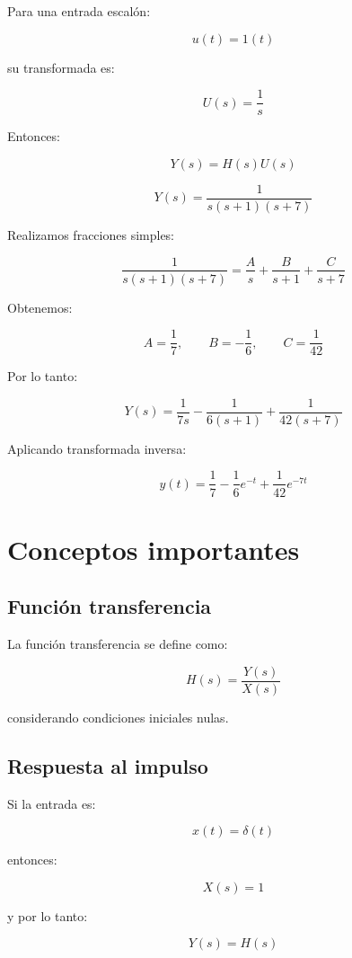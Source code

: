 \documentclass[12pt,a4paper]{article}
\begin{document}
Para una entrada escalón:

\[
u(t)=1(t)
\]

su transformada es:

\[
U(s)=\frac{1}{s}
\]

Entonces:

\[
Y(s)=H(s)U(s)
\]

\[
Y(s)
=
\frac{1}{s(s+1)(s+7)}
\]

Realizamos fracciones simples:

\[
\frac{1}{s(s+1)(s+7)}
=
\frac{A}{s}
+
\frac{B}{s+1}
+
\frac{C}{s+7}
\]

Obtenemos:

\[
A=\frac{1}{7},
\qquad
B=-\frac{1}{6},
\qquad
C=\frac{1}{42}
\]

Por lo tanto:

\[
Y(s)
=
\frac{1}{7s}
-
\frac{1}{6(s+1)}
+
\frac{1}{42(s+7)}
\]

Aplicando transformada inversa:

\[
\boxed{
y(t)
=
\frac{1}{7}
-
\frac{1}{6}e^{-t}
+
\frac{1}{42}e^{-7t}
}
\]

\newpage


\section*{Conceptos importantes}

\subsection*{Función transferencia}

La función transferencia se define como:

\[
\boxed{
H(s)=\frac{Y(s)}{X(s)}
}
\]

considerando condiciones iniciales nulas.

\subsection*{Respuesta al impulso}

Si la entrada es:

\[
x(t)=\delta(t)
\]

entonces:

\[
X(s)=1
\]

y por lo tanto:

\[
Y(s)=H(s)
\]
\end{document}
